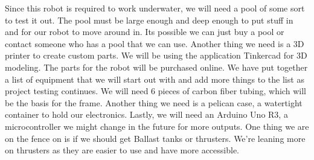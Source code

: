 Since this robot is required to work underwater, we will need a pool of some sort to test it out. The pool must be large enough and deep enough to put stuff in and for our robot to move around in. Its possible we can just buy a pool or contact someone who has a pool that we can use. Another thing we need is a 3D printer to create custom parts. We will be using the application Tinkercad for 3D modeling. The parts for the robot will be purchased online. We have put together a list of equipment that we will start out with and add more things to the list as project testing continues. We will need 6 pieces of carbon fiber tubing, which will be the basis for the frame. Another thing we need is a pelican case, a watertight container to hold our electronics. Lastly, we will need an Arduino Uno R3, a microcontroller we might change in the future for more outputs. One thing we are on the fence on is if we should get Ballast tanks or thrusters. We're leaning more on thrusters as they are easier to use and have more accessible.